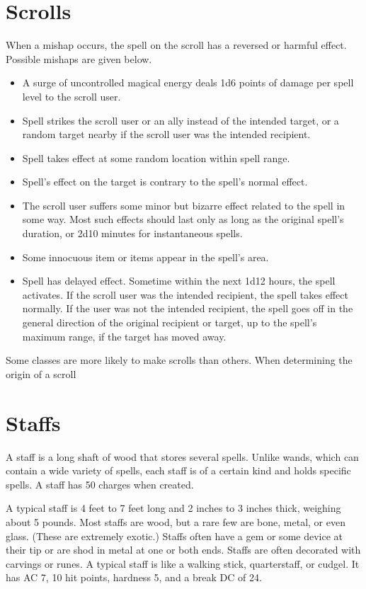 \section{Scrolls}

 When a mishap occurs, the spell on the scroll has a reversed or harmful effect. Possible mishaps are given below.
\begin{itemize}
\item A surge of uncontrolled magical energy deals 1d6 points of damage per spell level to the scroll user.
\item Spell strikes the scroll user or an ally instead of the intended target, or a random target nearby if the scroll user was the intended recipient.
\item Spell takes effect at some random location within spell range.
\item Spell's effect on the target is contrary to the spell's normal effect.
\item The scroll user suffers some minor but bizarre effect related to the spell in some way. Most such effects should last only as long as the original spell's duration, or 2d10 minutes for instantaneous spells.
\item Some innocuous item or items appear in the spell's area.
\item Spell has delayed effect. Sometime within the next 1d12 hours, the spell activates. If the scroll user was the intended recipient, the spell takes effect normally. If the user was not the intended recipient, the spell goes off in the general direction of the original recipient or target, up to the spell's maximum range, if the target has moved away.
\end{itemize}

 Some classes are more likely to make scrolls than others. When determining the origin of a scroll

\section{Staffs}

A staff is a long shaft of wood that stores several spells. Unlike wands, which can contain a wide variety of spells, each staff is of a certain kind and holds specific spells. A staff has 50 charges when created.

 A typical staff is 4 feet to 7 feet long and 2 inches to 3 inches thick, weighing about 5 pounds. Most staffs are wood, but a rare few are bone, metal, or even glass. (These are extremely exotic.) Staffs often have a gem or some device at their tip or are shod in metal at one or both ends. Staffs are often decorated with carvings or runes. A typical staff is like a walking stick, quarterstaff, or cudgel. It has AC 7, 10 hit points, hardness 5, and a break DC of 24.

